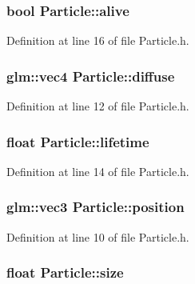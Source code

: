 \hypertarget{class_particle_affebffa1e11f05041c9c46e8b684275b}{
\subsubsection[{alive}]{\setlength{\rightskip}{0pt plus 5cm}bool Particle\-::alive}}\label{class_particle_affebffa1e11f05041c9c46e8b684275b}


Definition at line 16 of file Particle.\-h.

\hypertarget{class_particle_a59d1544a74c8c69b3d374987b5dc095c}{
\subsubsection[{diffuse}]{\setlength{\rightskip}{0pt plus 5cm}glm\-::vec4 Particle\-::diffuse}}\label{class_particle_a59d1544a74c8c69b3d374987b5dc095c}


Definition at line 12 of file Particle.\-h.

\hypertarget{class_particle_a79e332f17a1b96210a5ae3ce99f68c99}{
\subsubsection[{lifetime}]{\setlength{\rightskip}{0pt plus 5cm}float Particle\-::lifetime}}\label{class_particle_a79e332f17a1b96210a5ae3ce99f68c99}


Definition at line 14 of file Particle.\-h.

\hypertarget{class_particle_a779213904ef79ca56e740a01fbb369bf}{
\subsubsection[{position}]{\setlength{\rightskip}{0pt plus 5cm}glm\-::vec3 Particle\-::position}}\label{class_particle_a779213904ef79ca56e740a01fbb369bf}


Definition at line 10 of file Particle.\-h.

\hypertarget{class_particle_aad08a7cb8108751b7a49ed65118873f9}{
\subsubsection[{size}]{\setlength{\rightskip}{0pt plus 5cm}float Particle\-::size}}\label{class_particle_aad08a7cb8108751b7a49ed65118873f9}


